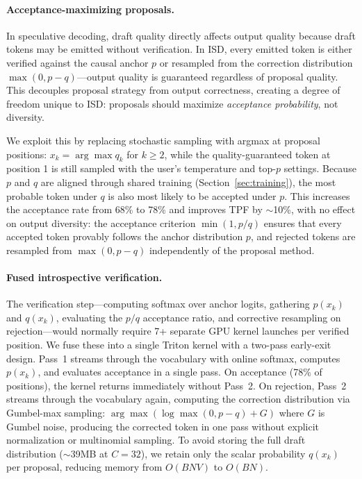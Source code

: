 \paragraph{Acceptance-maximizing proposals.}
In speculative decoding, draft quality directly affects output quality because draft tokens may be emitted without verification. In ISD, every emitted token is either verified against the causal anchor $p$ or resampled from the correction distribution $\max(0, p - q)$---output quality is guaranteed regardless of proposal quality. This decouples proposal strategy from output correctness, creating a degree of freedom unique to ISD: proposals should maximize \emph{acceptance probability}, not diversity.

We exploit this by replacing stochastic sampling with argmax at proposal positions: $x_k = \arg\max q_k$ for $k \geq 2$, while the quality-guaranteed token at position 1 is still sampled with the user's temperature and top-$p$ settings. Because $p$ and $q$ are aligned through shared training (Section~\ref{sec:training}), the most probable token under $q$ is also most likely to be accepted under $p$. This increases the acceptance rate from 68\% to 78\% and improves TPF by ${\sim}$10\%, with no effect on output diversity: the acceptance criterion $\min(1, p/q)$ ensures that every accepted token provably follows the anchor distribution $p$, and rejected tokens are resampled from $\max(0, p - q)$ independently of the proposal method.

\paragraph{Fused introspective verification.}
The verification step---computing softmax over anchor logits, gathering $p(x_k)$ and $q(x_k)$, evaluating the $p/q$ acceptance ratio, and corrective resampling on rejection---would normally require 7+ separate GPU kernel launches per verified position. We fuse these into a single Triton kernel with a two-pass early-exit design. Pass~1 streams through the vocabulary with online softmax, computes $p(x_k)$, and evaluates acceptance in a single pass. On acceptance (78\% of positions), the kernel returns immediately without Pass~2. On rejection, Pass~2 streams through the vocabulary again, computing the correction distribution via Gumbel-max sampling: $\arg\max(\log\max(0, p - q) + G)$ where $G$ is Gumbel noise, producing the corrected token in one pass without explicit normalization or multinomial sampling. To avoid storing the full draft distribution (${\sim}$39MB at $C{=}32$), we retain only the scalar probability $q(x_k)$ per proposal, reducing memory from $O(BNV)$ to $O(BN)$.

